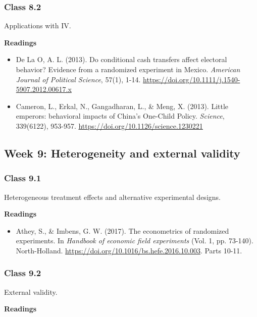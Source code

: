 \documentclass[letterpaper,12pt,parskip=full,DIV=10]{scrartcl}
\newcommand{\courseweek}[2]{\Needspace{12\baselineskip}\subsection*{Week #1: #2}}
\newcommand{\class}[2]{\Needspace{9\baselineskip}\subsubsection*{Class #1}\nopagebreak #2\par\nopagebreak\textbf{Readings}\par\nopagebreak}
\begin{document}
\class{8.2}{Applications with IV.}

\begin{itemize}

\item De La O, A. L. (2013). Do conditional cash transfers affect electoral behavior? Evidence from a randomized experiment in Mexico. \emph{American Journal of Political Science}, 57(1), 1-14.  \url{https://doi.org/10.1111/j.1540-5907.2012.00617.x}

\item Cameron, L., Erkal, N., Gangadharan, L., \& Meng, X. (2013). Little emperors: behavioral impacts of China's One-Child Policy. \emph{Science}, 339(6122), 953-957. \url{https://doi.org/10.1126/science.1230221}

\end{itemize}

\courseweek{9}{Heterogeneity and external validity}

\class{9.1}{Heterogeneous treatment effects and alternative experimental designs.}

\begin{itemize}

\item Athey, S., \& Imbens, G. W. (2017). The econometrics of randomized experiments. In \emph{Handbook of economic field experiments} (Vol. 1, pp. 73-140). North-Holland. \url{https://doi.org/10.1016/bs.hefe.2016.10.003}. Parts 10-11.

\end{itemize}

\class{9.2}{External validity.}
\end{document}
